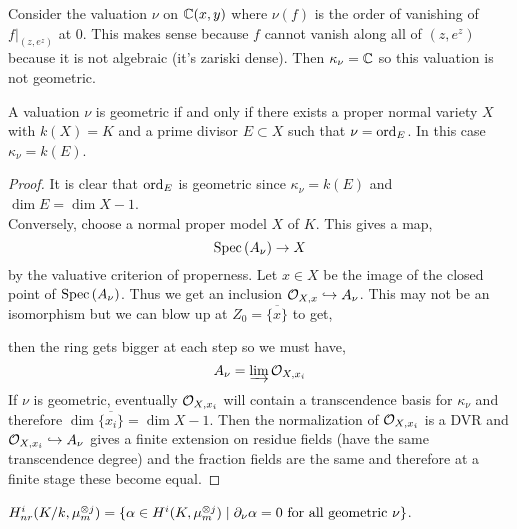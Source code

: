 \documentclass[12pt]{article}
\begin{document}
\begin{example}
Consider the valuation $\nu$ on $\mathbb{C}(x,y)$ where $\nu(f)$ is the order of vanishing of $f|_{(z, e^z)}$ at $0$. This makes sense because $f$ cannot vanish along all of $(z, e^z)$ because it is not algebraic (it's zariski dense). Then $\kappa_\nu = \mathbb{C}$ so this valuation is not geometric. 
\end{example}

\begin{prop}
A valuation $\nu$ is geometric if and only if there exists a proper normal variety $X$ with $k(X) = K$ and a prime divisor $E \subset X$ such that $\nu = \operatorname{\mathrm{ord}}_{E}$. In this case $\kappa_\nu = k(E)$.
\end{prop}

\begin{proof}
It is clear that $\operatorname{\mathrm{ord}}_{E}$ is geometric since $\kappa_\nu = k(E)$ and $\dim{E} = \dim{X} - 1$.
\bigskip\\
Conversely, choose a normal proper model $X$ of $K$. This gives a map,
\[ \mathrm{Spec}\left( A_\nu \right) \to X \]
by the valuative criterion of properness. Let $x \in X$ be the image of the closed point of $\mathrm{Spec}\left( A_\nu \right)$. Thus we get an inclusion $\mathcal{O}_{X, x} \hookrightarrow A_\nu$. This may not be an isomorphism but we can blow up at $Z_0 = \overline{ \{ x \} }$ to get,
\begin{center}
\end{center}
then the ring gets bigger at each step so we must have,
\[ A_\nu = \operatorname*{\varinjlim} \mathcal{O}_{X, x_i} \]
If $\nu$ is geometric, eventually $\mathcal{O}_{X, x_i}$ will contain a transcendence basis for $\kappa_\nu$ and therefore $\dim{\overline{ \{ x_i \} }} = \dim{X} - 1$. Then the normalization of $\mathcal{O}_{X, x_i}$ is a DVR and $\mathcal{O}_{X, x_i} \hookrightarrow A_\nu$ gives a finite extension on residue fields (have the same transcendence degree) and the fraction fields are the same and therefore at a finite stage these become equal.
\end{proof}

\begin{defn}
$H^i_{nr}(K/k, \mu_m^{\otimes j}) = \{ \alpha \in H^i(K, \mu_m^{\otimes j}) \mid \partial_\nu \alpha = 0 \text{ for all geometric } \nu \}$.
\end{defn}
\end{document}
